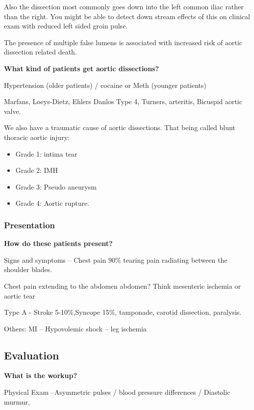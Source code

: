 \documentclass[
]{book}
\begin{document}
Also the dissection most commonly goes down into the left common iliac
rather than the right. You might be able to detect down stream effects
of this on clinical exam with reduced left sided groin pulse.

The presence of multiple false lumens is associated with increased risk
of aortic dissection related death.\citep{sueyoshi2013}

\textbf{What kind of patients get aortic dissections?}

Hypertension (older patients) / cocaine or Meth (younger patients)

Marfans, Loeys-Dietz, Ehlers Danlos Type 4, Turners, arteritis, Bicuspid
aortic valve.

We also have a traumatic cause of aortic dissections. That being called
blunt thoracic aortic injury:

\begin{itemize}
\item
  Grade 1: intima tear
\item
  Grade 2: IMH
\item
  Grade 3: Pseudo aneurysm
\item
  Grade 4: Aortic rupture.
\end{itemize}

\hypertarget{presentation-11}{%
\subsubsection{Presentation}\label{presentation-11}}

\textbf{How do these patients present?}

Signs and symptoms -- Chest pain 90\% tearing pain radiating between the
shoulder blades.

Chest pain extending to the abdomen abdomen? Think mesenteric ischemia
or aortic tear

Type A - Stroke 5-10\%,Syncope 15\%, tamponade, carotid dissection,
paralysis.

Others: MI -- Hypovolemic shock -- leg ischemia

\hypertarget{evaluation-16}{%
\subsection{Evaluation}\label{evaluation-16}}

\textbf{What is the workup?}

Physical Exam --Asymmetric pulses / blood pressure differences /
Diastolic murmur,
\end{document}
